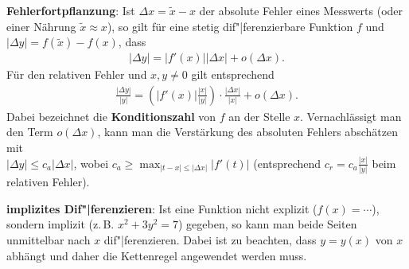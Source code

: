 \linie

\textbf{Fehlerfortpflanzung}:
Ist $\Delta x = \widetilde{x} - x$ der absolute Fehler eines Messwerts
(oder einer Nährung $\widetilde{x} \approx x$), so gilt für eine
stetig dif"|ferenzierbare Funktion $f$ und
$|\Delta y| = f(\widetilde{x}) - f(x)$, dass
\begin{align*}
    |\Delta y|
    = |f'(x)| |\Delta x| + o(\Delta x).
\end{align*}
Für den relativen Fehler und $x, y \not= 0$ gilt entsprechend
\begin{align*}
    \frac{|\Delta y|}{|y|}
    = \left(|f'(x)| \frac{|x|}{|y|}\right) \cdot
    \frac{|\Delta x|}{|x|} + o(\Delta x).
\end{align*}
Dabei bezeichnet  die
\textbf{Konditionszahl} von $f$ an der Stelle $x$.
Vernachlässigt man den Term $o(\Delta x)$, kann man die Verstärkung des
absoluten Fehlers abschätzen mit \\
$|\Delta y| \le c_a |\Delta x|$, wobei
$c_a \ge \max_{|t - x| \le |\Delta x|} |f'(t)|$
(entsprechend $c_r = c_a \frac{|x|}{|y|}$ beim relativen Fehler).

\linie

\textbf{implizites Dif"|ferenzieren}:
Ist eine Funktion nicht explizit ($f(x) = \dotsb$), sondern implizit
(z.\,B. $x^2 + 3y^2 = 7$) gegeben, so kann man beide Seiten unmittelbar
nach $x$ dif"|ferenzieren.
Dabei ist zu beachten, dass $y = y(x)$ von $x$ abhängt und daher
die Kettenregel angewendet werden muss.

\pagebreak
